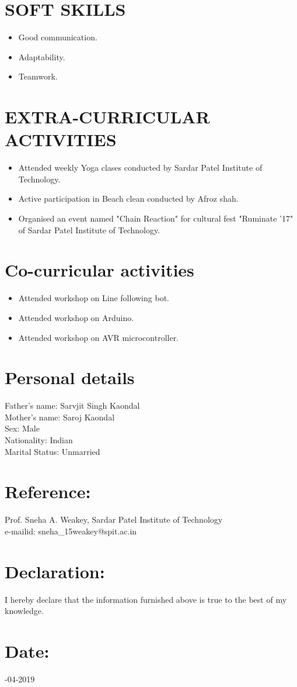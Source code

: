 \documentclass{article}
\begin{document}
\section*{\textbf{SOFT SKILLS}}
\begin{itemize}
\item Good communication.
\item Adaptability.
\item Teamwork.
\end{itemize}


\section*{\textbf{EXTRA-CURRICULAR ACTIVITIES}}
\begin{itemize}
\item Attended weekly Yoga clases conducted by Sardar Patel Institute of Technology. 
\item Active participation in Beach clean conducted by Afroz shah.
\item Organised an event named "Chain Reaction" for cultural fest "Ruminate '17" of Sardar Patel Institute of Technology.
\end{itemize}


\section*{\textbf{Co-curricular activities}}
\begin{itemize}
\item Attended workshop on Line following bot.
\item Attended workshop on Arduino.
\item Attended workshop on AVR microcontroller.
\end{itemize}


\section*{\textbf{Personal details}}
Father's name: Sarvjit Singh Kaondal\\
Mother's name: Saroj Kaondal\\
Sex: Male\\
Nationality: Indian\\
Marital Status: Unmarried


\section*{\normalsize{\textbf{Reference:}}}
\noindent 
Prof. Sneha A. Weakey, Sardar Patel Institute of Technology \\e-mailid: sneha\_15weakey@spit.ac.in


\section*{\textbf{\normalsize{Declaration:}}}
\noindent
 I hereby declare that the information furnished above is true to the best of my knowledge.


\section*{\textbf{\normalsize{Date:}}}
-04-2019 
\end{document}
